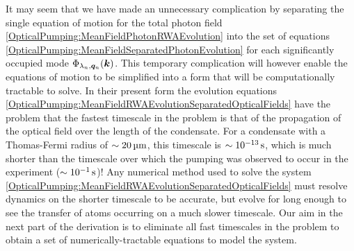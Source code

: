 It may seem that we have made an unnecessary complication by separating the single equation of motion for the total photon field \eqref{OpticalPumping:MeanFieldPhotonRWAEvolution} into the set of equations \eqref{OpticalPumping:MeanFieldSeparatedPhotonEvolution} for each significantly occupied mode $\Phi_{\lambda_n, \bm{q}_n}(\bm{k})$. This temporary complication will however enable the equations of motion to be simplified into a form that will be computationally tractable to solve.  In their present form the evolution equations \eqref{OpticalPumping:MeanFieldRWAEvolutionSeparatedOpticalFields} have the problem that the fastest timescale in the problem is that of the propagation of the optical field over the length of the condensate.  For a condensate with a Thomas-Fermi radius of $\sim \unit[20]{\micro m}$, this timescale is $\sim \unit[10^{-13}]{s}$, which is much shorter than the timescale over which the pumping was observed to occur in the experiment ($\sim \unit[10^{-1}]{s}$)!  Any numerical method used to solve the system \eqref{OpticalPumping:MeanFieldRWAEvolutionSeparatedOpticalFields} must resolve dynamics on the shorter timescale to be accurate, but evolve for long enough to see the transfer of atoms occurring on a much slower timescale.  Our aim in the next part of the derivation is to eliminate all fast timescales in the problem to obtain a set of numerically-tractable equations to model the system.

